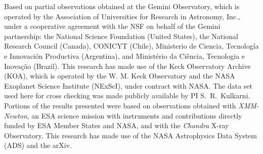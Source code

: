 \documentclass{nature_frb}
\begin{document}
\begin{addendum}
Based on partial observations obtained at the Gemini Observatory, which is operated by the Association of Universities for Research in Astronomy, Inc., under a cooperative agreement with the NSF on behalf of the Gemini partnership: the National Science Foundation (United States), the National Research Council (Canada), CONICYT (Chile), Ministerio de Ciencia, Tecnolog\'{i}a e Innovaci\'{o}n Productiva (Argentina), and Minist\'{e}rio da Ci\^{e}ncia, Tecnologia e Inova\c{c}\~{a}o (Brazil).
This research has made use of the Keck Observatory Archive (KOA), which is operated by the W. M. Keck Observatory and the NASA Exoplanet Science Institute (NExScI), under contract with NASA. The data set used here for cross checking was made publicly available by PI S.~R.~Kulkarni.
Portions of the results presented were based on observations obtained with {\it XMM-Newton}, an ESA science mission with instruments and contributions directly funded by ESA Member States and NASA, and with the {\it Chandra} X-ray Observatory.  This research has made use of the NASA Astrophysics Data System (ADS) and the arXiv.

\end{addendum}
\end{document}
